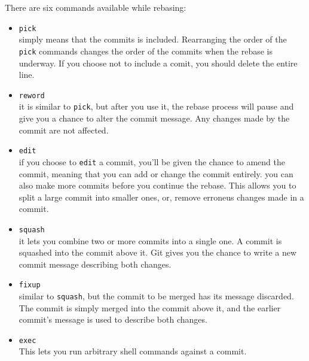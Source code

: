 There are six commands available while rebasing:
\begin{itemize}
    \item \texttt{pick}
    \\ simply means that the commits is included. Rearranging the order of the \texttt{pick} commands changes the order of the commits when the rebase is underway. If you choose not to include a comit, you should delete the entire line.
    \item \texttt{reword}
    \\ it is similar to \texttt{pick}, but after you use it, the rebase process will pause and give you a chance to alter the commit message. Any changes made by the commit are not affected. 
    \item \texttt{edit}
    \\ if you choose to \texttt{edit} a commit, you'll be given the chance to amend the commit, meaning that you can add or change the commit entirely. you can also make more commits before you continue the rebase. This allows you to split a large commit into smaller ones, or, remove erroneus changes made in a commit. 
    \item \texttt{squash}
    \\ it lets you combine two or more commits into a single one. A commit is squashed into the commit above it. Git gives you the chance to write a new commit message describing both changes. 
    \item \texttt{fixup}
    \\ similar to \texttt{squash}, but the commit to be merged has its message discarded. The commit is simply merged into the commit above it, and the earlier commit's message is used to describe both changes. 
    \item \texttt{exec}
    \\ This lets you run arbitrary shell commands against a commit. 
\end{itemize}

